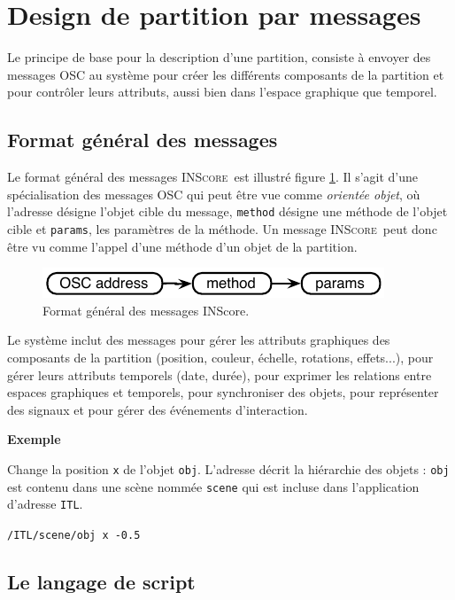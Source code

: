 \documentclass{article}
\newcommand{\inscore}		{\textsc{\small INScore}}
\newcommand{\code}[1]		{\texttt{\small #1}}
\newcommand{\sample}	[1]		{\begin{center}\colorbox{mygrey}{
								\begin{minipage}[t]{0.95\columnwidth} 
								{\small \texttt{#1}}
								\end{minipage}}\end{center}}
\newcounter{excount}
\newcommand{\exemple}			{\vspace{1mm} \hspace*{-4.5mm}\textbf{Exemple \arabic{excount}} \addtocounter{excount}{1}}
\begin{document}
\section{Design de partition par messages}\label{sec:msgs}

Le principe de base pour la description d'une partition, consiste à envoyer des messages OSC au système pour créer les différents composants de la partition et pour contrôler leurs attributs, aussi bien dans l'espace graphique que temporel.

\subsection{Format général des messages}
Le format général des messages \inscore\ est illustré figure \ref{fig:fgal}. Il s'agit d'une spécialisation des messages OSC qui peut être vue comme \emph{orientée objet}, où l'adresse désigne l'objet cible du message, \code{method} désigne une méthode de l'objet cible et \code{params}, les paramètres de la méthode.
Un message \inscore\ peut donc être vu comme l'appel d'une méthode d'un objet de la partition.


\begin{figure}[htbp]
\centerline{
	\includegraphics[width=0.8\columnwidth]{imgs/formatgal}}
\caption{Format général des messages INScore.}
\label{fig:fgal}
\end{figure}

Le système inclut des messages pour gérer les attributs graphiques des composants de la partition (position, couleur, échelle, rotations, effets...), pour gérer leurs attributs temporels (date, durée), pour exprimer les relations entre espaces graphiques et temporels, pour synchroniser des objets, pour représenter des signaux et pour gérer des événements d'interaction.

\exemple  Change la position \code{x} de l'objet \code{obj}. L'adresse décrit la hiérarchie des objets : \code{obj} est contenu dans une scène nommée \code{scene} qui est incluse dans l'application d'adresse \code{ITL}.
\vspace{-1mm}\sample{/ITL/scene/obj x -0.5}


\subsection{Le langage de script}
\end{document}
